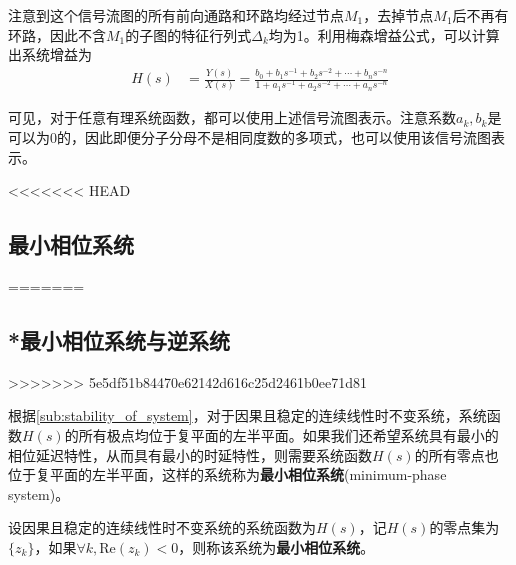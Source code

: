 注意到这个信号流图的所有前向通路和环路均经过节点$M_1$，去掉节点$M_1$后不再有环路，因此不含$M_1$的子图的特征行列式$\Delta_k$均为1。利用梅森增益公式，可以计算出系统增益为
\begin{align*}
    H(s)&=\frac{Y(s)}{X(s)}=\frac{b_0 + b_1 s^{-1} + b_2 s^{-2} + \cdots + b_n s^{-n}}{1 + a_1 s^{-1} + a_2 s^{-2} + \cdots + a_n s^{-n}}
\end{align*}

可见，对于任意有理系统函数，都可以使用上述信号流图表示。注意系数$a_k,b_k$是可以为0的，因此即便分子分母不是相同度数的多项式，也可以使用该信号流图表示。

<<<<<<< HEAD
\subsection{最小相位系统}\label{sub:min_phase}
=======
\subsection{*最小相位系统与逆系统}\label{sub:min_phase}
>>>>>>> 5e5df51b84470e62142d616c25d2461b0ee71d81

根据\ref{sub:stability_of_system}，对于因果且稳定的连续线性时不变系统，系统函数$H(s)$的所有极点均位于复平面的左半平面。如果我们还希望系统具有最小的相位延迟特性，从而具有最小的时延特性，则需要系统函数$H(s)$的所有零点也位于复平面的左半平面，这样的系统称为\textbf{最小相位系统}(minimum-phase system)。

\begin{definition}[最小相位系统]
    设因果且稳定的连续线性时不变系统的系统函数为$H(s)$，记$H(s)$的零点集为$\{z_k\}$，如果$\forall k,\text{Re}(z_k)<0$，则称该系统为\textbf{最小相位系统}。
\end{definition}

